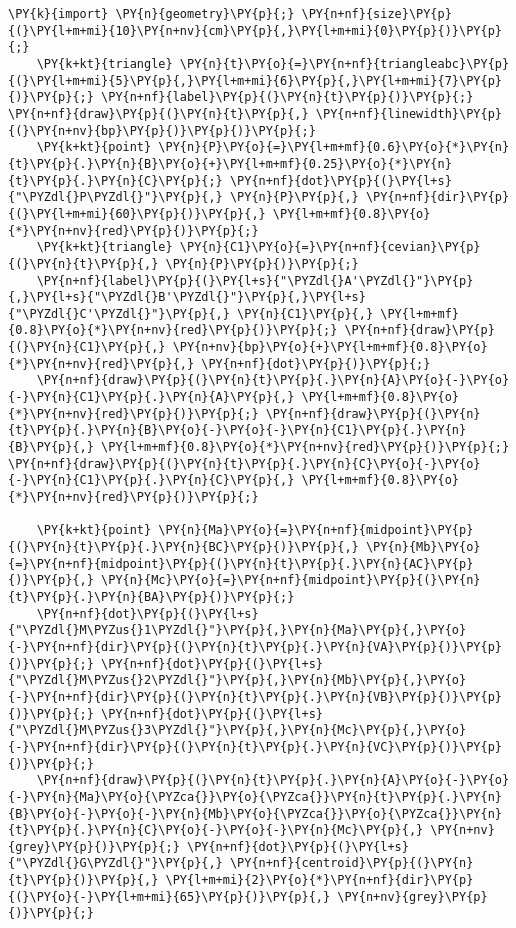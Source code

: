 \begin{Verbatim}[commandchars=\\\{\}]
    \PY{k}{import} \PY{n}{geometry}\PY{p}{;} \PY{n+nf}{size}\PY{p}{(}\PY{l+m+mi}{10}\PY{n+nv}{cm}\PY{p}{,}\PY{l+m+mi}{0}\PY{p}{)}\PY{p}{;}
    \PY{k+kt}{triangle} \PY{n}{t}\PY{o}{=}\PY{n+nf}{triangleabc}\PY{p}{(}\PY{l+m+mi}{5}\PY{p}{,}\PY{l+m+mi}{6}\PY{p}{,}\PY{l+m+mi}{7}\PY{p}{)}\PY{p}{;} \PY{n+nf}{label}\PY{p}{(}\PY{n}{t}\PY{p}{)}\PY{p}{;} \PY{n+nf}{draw}\PY{p}{(}\PY{n}{t}\PY{p}{,} \PY{n+nf}{linewidth}\PY{p}{(}\PY{n+nv}{bp}\PY{p}{)}\PY{p}{)}\PY{p}{;}
    \PY{k+kt}{point} \PY{n}{P}\PY{o}{=}\PY{l+m+mf}{0.6}\PY{o}{*}\PY{n}{t}\PY{p}{.}\PY{n}{B}\PY{o}{+}\PY{l+m+mf}{0.25}\PY{o}{*}\PY{n}{t}\PY{p}{.}\PY{n}{C}\PY{p}{;} \PY{n+nf}{dot}\PY{p}{(}\PY{l+s}{"\PYZdl{}P\PYZdl{}"}\PY{p}{,} \PY{n}{P}\PY{p}{,} \PY{n+nf}{dir}\PY{p}{(}\PY{l+m+mi}{60}\PY{p}{)}\PY{p}{,} \PY{l+m+mf}{0.8}\PY{o}{*}\PY{n+nv}{red}\PY{p}{)}\PY{p}{;}
    \PY{k+kt}{triangle} \PY{n}{C1}\PY{o}{=}\PY{n+nf}{cevian}\PY{p}{(}\PY{n}{t}\PY{p}{,} \PY{n}{P}\PY{p}{)}\PY{p}{;}
    \PY{n+nf}{label}\PY{p}{(}\PY{l+s}{"\PYZdl{}A'\PYZdl{}"}\PY{p}{,}\PY{l+s}{"\PYZdl{}B'\PYZdl{}"}\PY{p}{,}\PY{l+s}{"\PYZdl{}C'\PYZdl{}"}\PY{p}{,} \PY{n}{C1}\PY{p}{,} \PY{l+m+mf}{0.8}\PY{o}{*}\PY{n+nv}{red}\PY{p}{)}\PY{p}{;} \PY{n+nf}{draw}\PY{p}{(}\PY{n}{C1}\PY{p}{,} \PY{n+nv}{bp}\PY{o}{+}\PY{l+m+mf}{0.8}\PY{o}{*}\PY{n+nv}{red}\PY{p}{,} \PY{n+nf}{dot}\PY{p}{)}\PY{p}{;}
    \PY{n+nf}{draw}\PY{p}{(}\PY{n}{t}\PY{p}{.}\PY{n}{A}\PY{o}{-}\PY{o}{-}\PY{n}{C1}\PY{p}{.}\PY{n}{A}\PY{p}{,} \PY{l+m+mf}{0.8}\PY{o}{*}\PY{n+nv}{red}\PY{p}{)}\PY{p}{;} \PY{n+nf}{draw}\PY{p}{(}\PY{n}{t}\PY{p}{.}\PY{n}{B}\PY{o}{-}\PY{o}{-}\PY{n}{C1}\PY{p}{.}\PY{n}{B}\PY{p}{,} \PY{l+m+mf}{0.8}\PY{o}{*}\PY{n+nv}{red}\PY{p}{)}\PY{p}{;} \PY{n+nf}{draw}\PY{p}{(}\PY{n}{t}\PY{p}{.}\PY{n}{C}\PY{o}{-}\PY{o}{-}\PY{n}{C1}\PY{p}{.}\PY{n}{C}\PY{p}{,} \PY{l+m+mf}{0.8}\PY{o}{*}\PY{n+nv}{red}\PY{p}{)}\PY{p}{;}

    \PY{k+kt}{point} \PY{n}{Ma}\PY{o}{=}\PY{n+nf}{midpoint}\PY{p}{(}\PY{n}{t}\PY{p}{.}\PY{n}{BC}\PY{p}{)}\PY{p}{,} \PY{n}{Mb}\PY{o}{=}\PY{n+nf}{midpoint}\PY{p}{(}\PY{n}{t}\PY{p}{.}\PY{n}{AC}\PY{p}{)}\PY{p}{,} \PY{n}{Mc}\PY{o}{=}\PY{n+nf}{midpoint}\PY{p}{(}\PY{n}{t}\PY{p}{.}\PY{n}{BA}\PY{p}{)}\PY{p}{;}
    \PY{n+nf}{dot}\PY{p}{(}\PY{l+s}{"\PYZdl{}M\PYZus{}1\PYZdl{}"}\PY{p}{,}\PY{n}{Ma}\PY{p}{,}\PY{o}{-}\PY{n+nf}{dir}\PY{p}{(}\PY{n}{t}\PY{p}{.}\PY{n}{VA}\PY{p}{)}\PY{p}{)}\PY{p}{;} \PY{n+nf}{dot}\PY{p}{(}\PY{l+s}{"\PYZdl{}M\PYZus{}2\PYZdl{}"}\PY{p}{,}\PY{n}{Mb}\PY{p}{,}\PY{o}{-}\PY{n+nf}{dir}\PY{p}{(}\PY{n}{t}\PY{p}{.}\PY{n}{VB}\PY{p}{)}\PY{p}{)}\PY{p}{;} \PY{n+nf}{dot}\PY{p}{(}\PY{l+s}{"\PYZdl{}M\PYZus{}3\PYZdl{}"}\PY{p}{,}\PY{n}{Mc}\PY{p}{,}\PY{o}{-}\PY{n+nf}{dir}\PY{p}{(}\PY{n}{t}\PY{p}{.}\PY{n}{VC}\PY{p}{)}\PY{p}{)}\PY{p}{;}
    \PY{n+nf}{draw}\PY{p}{(}\PY{n}{t}\PY{p}{.}\PY{n}{A}\PY{o}{-}\PY{o}{-}\PY{n}{Ma}\PY{o}{\PYZca{}}\PY{o}{\PYZca{}}\PY{n}{t}\PY{p}{.}\PY{n}{B}\PY{o}{-}\PY{o}{-}\PY{n}{Mb}\PY{o}{\PYZca{}}\PY{o}{\PYZca{}}\PY{n}{t}\PY{p}{.}\PY{n}{C}\PY{o}{-}\PY{o}{-}\PY{n}{Mc}\PY{p}{,} \PY{n+nv}{grey}\PY{p}{)}\PY{p}{;} \PY{n+nf}{dot}\PY{p}{(}\PY{l+s}{"\PYZdl{}G\PYZdl{}"}\PY{p}{,} \PY{n+nf}{centroid}\PY{p}{(}\PY{n}{t}\PY{p}{)}\PY{p}{,} \PY{l+m+mi}{2}\PY{o}{*}\PY{n+nf}{dir}\PY{p}{(}\PY{o}{-}\PY{l+m+mi}{65}\PY{p}{)}\PY{p}{,} \PY{n+nv}{grey}\PY{p}{)}\PY{p}{;}


\end{Verbatim}
